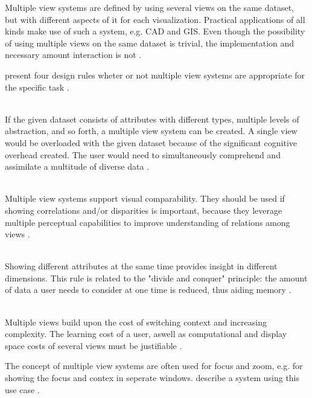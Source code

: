 Multiple view systems are defined by using several views on the same dataset, but with different aspects of it for each visualization. Practical applications of all kinds make use of such a system, e.g. \ac{CAD} and \ac{GIS}. Even though the possibility of using multiple views on the same dataset is trivial, the implementation and necessary amount interaction is not .

\citeauthor{Baldonado2000} present four design rules wheter or not multiple view systems are appropriate for the specific task .

\begin{enumerate}

 \hfill \\
If the given dataset consists of attributes with different types, multiple levels of abstraction, and so forth, a multiple view system can be created. A single view would be overloaded with the given dataset because of the significant cognitive overhead created. The user would need to simultaneously comprehend and assimilate a multitude of diverse data .

 \hfill \\
Multiple view systems support visual comparability. They should be used if showing correlations and/or disparities is important, because they leverage multiple perceptual capabilities to improve understanding of relations among views .

 \hfill \\
Showing different attributes at the same time provides insight in different dimensions. This rule is related to the "divide and conquer" principle: the amount of data a user needs to consider at one time is reduced, thus aiding memory .

 \hfill \\
Multiple views build upon the cost of switching context and increasing complexity. The learning cost of a user, aswell as computational and display space costs of several views must be justifiable .

\end{enumerate}

The concept of multiple view systems are often used for focus and zoom, e.g. for showing the focus and contex in seperate windows. \citeauthor{Robert:1998} describe a system using this use case .

